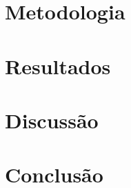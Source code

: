 \documentclass[12pt]{article}
\begin{document}

\section{Metodologia}
\label{sec:metodologia}


\section{Resultados}
\label{sec:resultados}


\section{Discussão}
\label{sec:discussao}


\section{Conclusão}
\label{sec:conclusao}




\end{document}
